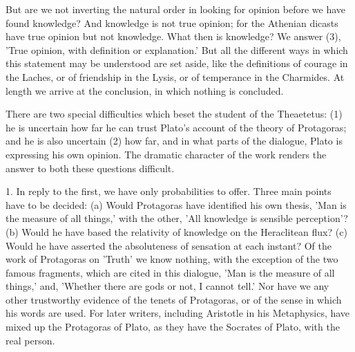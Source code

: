 \documentclass[11pt,letter]{article}
\begin{document}
\par  But are we not inverting the natural order in looking for opinion before we have found knowledge? And knowledge is not true opinion; for the Athenian dicasts have true opinion but not knowledge. What then is knowledge? We answer (3), 'True opinion, with definition or explanation.' But all the different ways in which this statement may be understood are set aside, like the definitions of courage in the Laches, or of friendship in the Lysis, or of temperance in the Charmides. At length we arrive at the conclusion, in which nothing is concluded.

\par  There are two special difficulties which beset the student of the Theaetetus: (1) he is uncertain how far he can trust Plato's account of the theory of Protagoras; and he is also uncertain (2) how far, and in what parts of the dialogue, Plato is expressing his own opinion. The dramatic character of the work renders the answer to both these questions difficult.

\par  1. In reply to the first, we have only probabilities to offer. Three main points have to be decided: (a) Would Protagoras have identified his own thesis, 'Man is the measure of all things,' with the other, 'All knowledge is sensible perception'? (b) Would he have based the relativity of knowledge on the Heraclitean flux? (c) Would he have asserted the absoluteness of sensation at each instant? Of the work of Protagoras on 'Truth' we know nothing, with the exception of the two famous fragments, which are cited in this dialogue, 'Man is the measure of all things,' and, 'Whether there are gods or not, I cannot tell.' Nor have we any other trustworthy evidence of the tenets of Protagoras, or of the sense in which his words are used. For later writers, including Aristotle in his Metaphysics, have mixed up the Protagoras of Plato, as they have the Socrates of Plato, with the real person.
\end{document}
